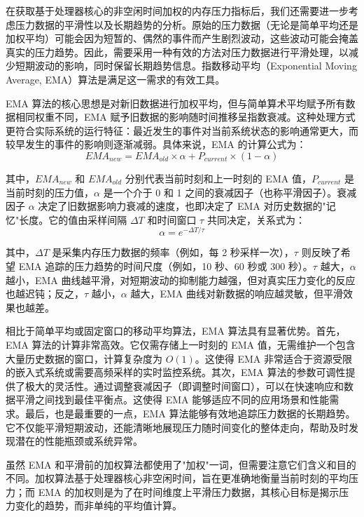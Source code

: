 在获取基于处理器核心的非空闲时间加权的内存压力指标后，我们还需要进一步考虑压力数据的平滑性以及长期趋势的分析。原始的压力数据（无论是简单平均还是加权平均）可能会因为短暂的、偶然的事件而产生剧烈波动，这些波动可能会掩盖真实的压力趋势。因此，需要采用一种有效的方法对压力数据进行平滑处理，以减少短期波动的影响，同时保留长期趋势信息。指数移动平均（Exponential Moving Average, EMA）算法是满足这一需求的有效工具。

EMA 算法的核心思想是对新旧数据进行加权平均，但与简单算术平均赋予所有数据相同权重不同，EMA 赋予旧数据的影响随时间推移呈指数衰减。这种处理方式更符合实际系统的运行特征：最近发生的事件对当前系统状态的影响通常更大，而较早发生的事件的影响则逐渐减弱。具体来说，EMA 的计算公式为：
\begin{equation}
    EMA_{new} = EMA_{old} \times \alpha + P_{current} \times (1 - \alpha)
    \label{eq:EMA}
\end{equation}


其中，\(EMA_{new}\) 和 \(EMA_{old}\) 分别代表当前时刻和上一时刻的 EMA 值，\(P_{current}\) 是当前时刻的压力值，\(\alpha\) 是一个介于 0 和 1 之间的衰减因子（也称平滑因子）。衰减因子 \(\alpha\) 决定了旧数据影响力衰减的速度，也即决定了 EMA 对历史数据的"记忆"长度。它的值由采样间隔 \(\Delta T\) 和时间窗口 \(\tau\) 共同决定，关系式为：
\[
\alpha = e^{-\Delta T / \tau}
\]

其中，\(\Delta T\) 是采集内存压力数据的频率（例如，每 2 秒采样一次），\(\tau\) 则反映了希望 EMA 追踪的压力趋势的时间尺度（例如，10 秒、60 秒或 300 秒）。\(\tau\) 越大，\(\alpha\) 越小，EMA 曲线越平滑，对短期波动的抑制能力越强，但对真实压力变化的反应也越迟钝；反之，\(\tau\) 越小，\(\alpha\) 越大，EMA 曲线对新数据的响应越灵敏，但平滑效果也越差。

相比于简单平均或固定窗口的移动平均算法，EMA 算法具有显著优势。首先，EMA 算法的计算非常高效。它仅需存储上一时刻的 EMA 值，无需维护一个包含大量历史数据的窗口，计算复杂度为 \(O(1)\)。这使得 EMA 非常适合于资源受限的嵌入式系统或需要高频采样的实时监控系统。其次，EMA 算法的参数可调性提供了极大的灵活性。通过调整衰减因子（即调整时间窗口），可以在快速响应和数据平滑之间找到最佳平衡点。这使得 EMA 能够适应不同的应用场景和性能需求。最后，也是最重要的一点，EMA 算法能够有效地追踪压力数据的长期趋势。它不仅能平滑短期波动，还能清晰地展现压力随时间变化的整体走向，帮助及时发现潜在的性能瓶颈或系统异常。

虽然 EMA 和平滑前的加权算法都使用了"加权"一词，但需要注意它们含义和目的不同。加权算法基于处理器核心非空闲时间，旨在更准确地衡量当前时刻的平均压力；而 EMA 的加权则是为了在时间维度上平滑压力数据，其核心目标是揭示压力变化的趋势，而非单纯的平均值计算。

